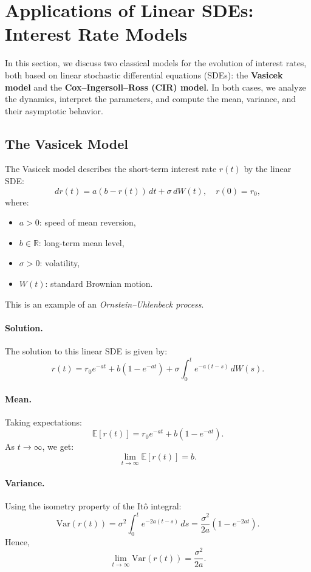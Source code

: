 
\section{Applications of Linear SDEs: Interest Rate Models}

In this section, we discuss two classical models for the evolution of interest rates, both based on linear stochastic differential equations (SDEs): the \textbf{Vasicek model} and the \textbf{Cox–Ingersoll–Ross (CIR) model}. In both cases, we analyze the dynamics, interpret the parameters, and compute the mean, variance, and their asymptotic behavior.

\subsection{The Vasicek Model}

The Vasicek model describes the short-term interest rate \( r(t) \) by the linear SDE:
\[
dr(t) = a(b - r(t))\,dt + \sigma\,dW(t), \quad r(0) = r_0,
\]
where:
\begin{itemize}
    \item \( a > 0 \): speed of mean reversion,
    \item \( b \in \mathbb{R} \): long-term mean level,
    \item \( \sigma > 0 \): volatility,
    \item \( W(t) \): standard Brownian motion.
\end{itemize}

This is an example of an \emph{Ornstein–Uhlenbeck process}.

\paragraph{Solution.}
The solution to this linear SDE is given by:
\[
r(t) = r_0 e^{-a t} + b(1 - e^{-a t}) + \sigma \int_0^t e^{-a(t-s)}\, dW(s).
\]

\paragraph{Mean.}
Taking expectations:
\[
\mathbb{E}[r(t)] = r_0 e^{-a t} + b(1 - e^{-a t}).
\]
As \( t \to \infty \), we get:
\[
\lim_{t \to \infty} \mathbb{E}[r(t)] = b.
\]

\paragraph{Variance.}
Using the isometry property of the Itô integral:
\[
\text{Var}(r(t)) = \sigma^2 \int_0^t e^{-2a(t-s)}\, ds = \frac{\sigma^2}{2a}(1 - e^{-2a t}).
\]
Hence,
\[
\lim_{t \to \infty} \text{Var}(r(t)) = \frac{\sigma^2}{2a}.
\]

